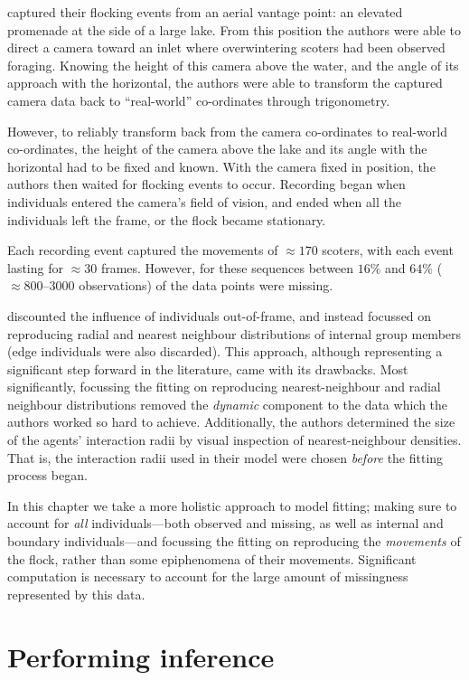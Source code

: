 \textcite{lukeman10} captured their flocking events from an aerial vantage
point: an elevated promenade at the side of a large lake. From this position
the authors were able to direct a camera toward an inlet where overwintering
scoters had been observed foraging. Knowing the height of this camera above the
water, and the angle of its approach with the horizontal, the authors were able
to transform the captured camera data back to ``real-world'' co-ordinates
through trigonometry.

However, to reliably transform back from the camera co-ordinates to real-world
co-ordinates, the height of the camera above the lake and its angle with the
horizontal had to be fixed and known. With the camera fixed in position, the
authors then waited for flocking events to occur. Recording began when
individuals entered the camera's field of vision, and ended when all the
individuals left the frame, or the flock became stationary.

Each recording event captured the movements of $\approx170$ scoters, with each
event lasting for $\approx30$ frames. However, for these sequences between
$16\%$ and $64\%$ ($\approx800$--$3000$ observations) of the data points were
missing.

\textcite{lukeman10} discounted the influence of individuals out-of-frame, and
instead focussed on reproducing radial and nearest neighbour distributions of
internal group members (edge individuals were also discarded). This approach,
although representing a significant step forward in the literature, came with
its drawbacks. Most significantly, focussing the fitting on reproducing
nearest-neighbour and radial neighbour distributions removed the \emph{dynamic}
component to the data which the authors worked so hard to achieve.
Additionally, the authors determined the size of the agents' interaction radii
by visual inspection of nearest-neighbour densities. That is, the interaction
radii used in their model were chosen \emph{before} the fitting process began.

In this chapter we take a more holistic approach to model fitting; making sure
to account for \emph{all} individuals---both observed and missing, as well as
internal and boundary individuals---and focussing the fitting on reproducing
the \emph{movements} of the flock, rather than some epiphenomena of their
movements. Significant computation is necessary to account for the large amount
of missingness represented by this data.

\section{Performing inference}

